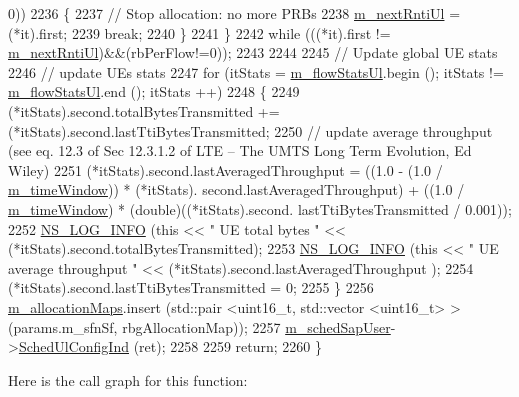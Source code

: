 \begin{DoxyCode}
       0))
2236         \{
2237           \textcolor{comment}{// Stop allocation: no more PRBs}
2238           \hyperlink{classns3_1_1CqaFfMacScheduler_adc4185e06ef2d451669d3b1b4f0d7760}{m\_nextRntiUl} = (*it).first;
2239           \textcolor{keywordflow}{break};
2240         \}
2241     \}
2242   \textcolor{keywordflow}{while} (((*it).first != \hyperlink{classns3_1_1CqaFfMacScheduler_adc4185e06ef2d451669d3b1b4f0d7760}{m\_nextRntiUl})&&(rbPerFlow!=0));
2243 
2244 
2245   \textcolor{comment}{// Update global UE stats}
2246   \textcolor{comment}{// update UEs stats}
2247   \textcolor{keywordflow}{for} (itStats = \hyperlink{classns3_1_1CqaFfMacScheduler_ab5815a4876dc296d83b3d2d633418312}{m\_flowStatsUl}.begin (); itStats != \hyperlink{classns3_1_1CqaFfMacScheduler_ab5815a4876dc296d83b3d2d633418312}{m\_flowStatsUl}.end (); itStats
      ++)
2248     \{
2249       (*itStats).second.totalBytesTransmitted += (*itStats).second.lastTtiBytesTransmitted;
2250       \textcolor{comment}{// update average throughput (see eq. 12.3 of Sec 12.3.1.2 of LTE – The UMTS Long Term Evolution, Ed
       Wiley)}
2251       (*itStats).second.lastAveragedThroughput = ((1.0 - (1.0 / \hyperlink{classns3_1_1CqaFfMacScheduler_a2e6951b5a91130305fe3d835bca0f33d}{m\_timeWindow})) * (*itStats).
      second.lastAveragedThroughput) + ((1.0 / \hyperlink{classns3_1_1CqaFfMacScheduler_a2e6951b5a91130305fe3d835bca0f33d}{m\_timeWindow}) * (double)((*itStats).second.
      lastTtiBytesTransmitted / 0.001));
2252       \hyperlink{group__logging_gafbd73ee2cf9f26b319f49086d8e860fb}{NS\_LOG\_INFO} (\textcolor{keyword}{this} << \textcolor{stringliteral}{" UE total bytes "} << (*itStats).second.totalBytesTransmitted);
2253       \hyperlink{group__logging_gafbd73ee2cf9f26b319f49086d8e860fb}{NS\_LOG\_INFO} (\textcolor{keyword}{this} << \textcolor{stringliteral}{" UE average throughput "} << (*itStats).second.lastAveragedThroughput
      );
2254       (*itStats).second.lastTtiBytesTransmitted = 0;
2255     \}
2256   \hyperlink{classns3_1_1CqaFfMacScheduler_a3b02c0d7a89f3ed393066ba9bfda6210}{m\_allocationMaps}.insert (std::pair <uint16\_t, std::vector <uint16\_t> > (params.m\_sfnSf, 
      rbgAllocationMap));
2257   \hyperlink{classns3_1_1CqaFfMacScheduler_a42f4b19ce093643c5fa8202ac18ec569}{m\_schedSapUser}->\hyperlink{classns3_1_1FfMacSchedSapUser_a1b89636256701a84d990db7db8aea874}{SchedUlConfigInd} (ret);
2258 
2259   \textcolor{keywordflow}{return};
2260 \}
\end{DoxyCode}


Here is the call graph for this function\+:




